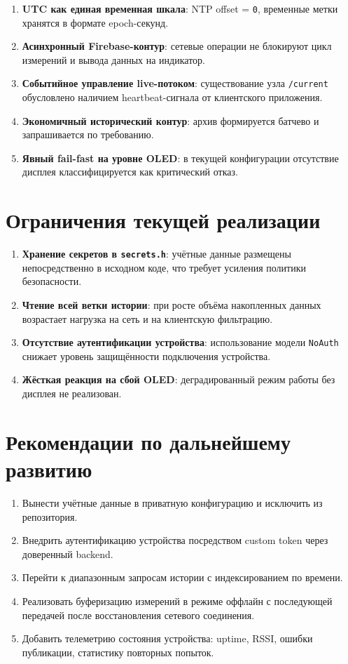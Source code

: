 \begin{enumerate}
    \item \textbf{UTC как единая временная шкала}: NTP offset = \texttt{0}, временные метки хранятся в формате epoch-секунд.
    \item \textbf{Асинхронный Firebase-контур}: сетевые операции не блокируют цикл измерений и вывода данных на индикатор.
    \item \textbf{Событийное управление live-потоком}: существование узла \texttt{/current} обусловлено наличием heartbeat-сигнала от клиентского приложения.
    \item \textbf{Экономичный исторический контур}: архив формируется батчево и запрашивается по требованию.
    \item \textbf{Явный fail-fast на уровне OLED}: в текущей конфигурации отсутствие дисплея классифицируется как критический отказ.
\end{enumerate}

\section{Ограничения текущей реализации}

\begin{enumerate}
    \item \textbf{Хранение секретов в \texttt{secrets.h}}: учётные данные размещены непосредственно в исходном коде, что требует усиления политики безопасности.
    \item \textbf{Чтение всей ветки истории}: при росте объёма накопленных данных возрастает нагрузка на сеть и на клиентскую фильтрацию.
    \item \textbf{Отсутствие аутентификации устройства}: использование модели \texttt{NoAuth} снижает уровень защищённости подключения устройства.
    \item \textbf{Жёсткая реакция на сбой OLED}: деградированный режим работы без дисплея не реализован.
\end{enumerate}

\section{Рекомендации по дальнейшему развитию}

\begin{enumerate}
    \item Вынести учётные данные в приватную конфигурацию и исключить из репозитория.
    \item Внедрить аутентификацию устройства посредством custom token через доверенный backend.
    \item Перейти к диапазонным запросам истории с индексированием по времени.
    \item Реализовать буферизацию измерений в режиме оффлайн с последующей передачей после восстановления сетевого соединения.
    \item Добавить телеметрию состояния устройства: uptime, RSSI, ошибки публикации, статистику повторных попыток.
\end{enumerate}

